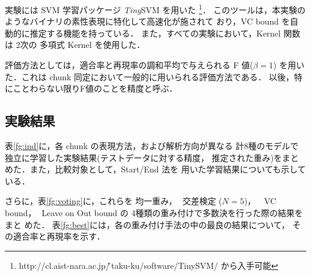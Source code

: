 実験には SVM 学習パッケージ {\it Tiny}SVM を用いた
\footnote{http://cl.aist-nara.ac.jp/\~\,taku-ku/software/TinySVM/ から入手可能}．
このツールは，本実験のようなバイナリの素性表現に特化して高速化が施されて
おり，VC bound を自動的に推定する機能を持っている．
また，すべての実験において，Kernel 関数は 2次の 多項式 Kernel を使用した．

評価方法としては，適合率と再現率の調和平均で与えられる F 値($\beta = 1$)
を用いた．これは chunk 同定において一般的に用いられる評価方法である．
以後，特にことわらない限りF値のことを精度と呼ぶ．

\subsection{実験結果}
表\ref{fg:ind}に，各 chunk の表現方法，および解析方向が異なる
計8種のモデルで独立に学習した実験結果(テストデータに対する精度，
推定された重み)をまとめた．また，比較対象として，Start/End 法を
用いた学習結果についても示している．

さらに，表\ref{fg:voting}に，これらを 均一重み，\,\, 交差検定 ($N=5$)，
\,\, VC bound，\,\,
Leave on Out bound の 4種類の重み付けで多数決を行った際の結果をまと
めた． 表\ref{fg:best}には，各の重み付け手法の中の最良の結果について，
その適合率と再現率を示す．


